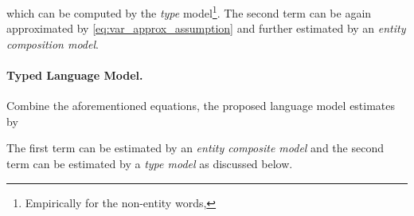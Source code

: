 \documentclass[11pt,a4paper]{article}
\begin{document}
which can be computed by the {\it type} model\footnote{Empirically for the non-entity words, }. 
The second term can be again approximated by \eqref{eq:var_approx_assumption} and further estimated by an {\it entity composition model}.



\paragraph{\bf Typed Language Model.} Combine the aforementioned equations, the proposed language model estimates  by 


The first term can be estimated by an {\it entity composite model}  and the second term can be estimated by a {\it type model} as discussed below.

\begin{comment}


where . We assume that the type context  is sufficient enough to learn to predict the type  of the next token  regardless the actual word context . In other words, model parameter  which predicts  can be trained properly without ,




Similarly, for  , we do not need to provide the type s(w) explicitly as per the assumption in Equation \ref{eq:approx_assumption}, the given type context  is implicitly sufficient enough to provide the model the type  of the next word, in other words 






Hence, Equation \ref{eq:decomposed} becomes 




If  \footnote{empirically we also found that for the recipe corpus,  },  we can further consider that . Therefore,
 


where  and   denote the hidden state of a recurrent neural network language model given the context  only and (, ) together. 



We learn model parameters  and  independently by training two language models  , and     respectively. Given the context of type,   predicts the type of the next word. Given the context and the type information of all the candidate words,     predicts the conditional actual word (e.g., entity name). At inference time the generated probabilities from these two models are combined according to conditional probability distribution law Equation \ref{eq:main} which gives the final probability distribution over all candidate words (see Fig \ref{fig:model}). In section \ref{type model} and \ref{entity composite model}, we discuss the  , and     respectively. 

\end{comment}
\end{document}
